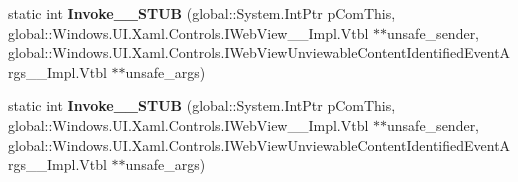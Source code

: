 \begin{DoxyCompactItemize}
\item 
\mbox{\label{struct_windows_1_1_foundation_1_1_typed_event_handler___a___windows___u_i___xaml___controls___we525068a3adb52520cb6e4320f7738461_a9998a30b0206927bfb5834d0c00c5947}} 
static int {\bfseries Invoke\+\_\+\+\_\+\+S\+T\+UB} (global\+::\+System.\+Int\+Ptr p\+Com\+This, global\+::\+Windows.\+U\+I.\+Xaml.\+Controls.\+I\+Web\+View\+\_\+\+\_\+\+Impl.\+Vtbl $\ast$$\ast$unsafe\+\_\+sender, global\+::\+Windows.\+U\+I.\+Xaml.\+Controls.\+I\+Web\+View\+Unviewable\+Content\+Identified\+Event\+Args\+\_\+\+\_\+\+Impl.\+Vtbl $\ast$$\ast$unsafe\+\_\+args)
\item 
\mbox{\label{struct_windows_1_1_foundation_1_1_typed_event_handler___a___windows___u_i___xaml___controls___we525068a3adb52520cb6e4320f7738461_a9998a30b0206927bfb5834d0c00c5947}} 
static int {\bfseries Invoke\+\_\+\+\_\+\+S\+T\+UB} (global\+::\+System.\+Int\+Ptr p\+Com\+This, global\+::\+Windows.\+U\+I.\+Xaml.\+Controls.\+I\+Web\+View\+\_\+\+\_\+\+Impl.\+Vtbl $\ast$$\ast$unsafe\+\_\+sender, global\+::\+Windows.\+U\+I.\+Xaml.\+Controls.\+I\+Web\+View\+Unviewable\+Content\+Identified\+Event\+Args\+\_\+\+\_\+\+Impl.\+Vtbl $\ast$$\ast$unsafe\+\_\+args)
\end{DoxyCompactItemize}
